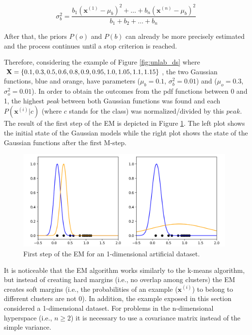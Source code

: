 \begin{equation}
    \sigma^{2}_b = \frac{b_{1}(\mathbf{x}^{(1)} - \mu_{b})^{2} + \ldots + b_{n}(\mathbf{x}^{(n)} - \mu_{b})^{2}}{b_{1} + b_{2} + \ldots + b_{n}}
\end{equation}

After that, the priors $P(o)$ and $P(b)$ can already be more precisely estimated and the process continues until a stop criterion is reached.

Therefore, considering the example of Figure \ref{fig:unlab_ds} where $\mathbf{X} = \{0.1, 0.3, 0.5,\\ 0.6, 0.8, 0.9, 0.95, 1.0, 1.05, 1.1, 1.15 \}$, the two Gaussian functions, blue and orange, have parameters ($\mu_{b} = 0.1$, $\sigma^{2}_{b} = 0.01$) and ($\mu_{o} = 0.3$, $\sigma^{2}_{o} = 0.01$). In order to obtain the outcomes from the pdf functions between 0 and 1, the highest \textit{peak} between both Gaussian functions was found and each $P(\mathbf{x}^{(i)}|c)$ (where $c$ stands for the class) was normalized/divided by this $peak$. The result of the first step of the EM is depicted in Figure \ref{fig:step1}. The left plot shows the initial state of the Gaussian models while the right plot shows the state of the Gaussian functions after the first M-step.

\begin{figure}[ht]
\centering
\includegraphics[width=11cm]{"Part 3 - Learning Systems/Unsupervised Learning/Expectation-Maximization/figures/step1.png"}
\caption{First step of the EM for an 1-dimensional artificial dataset.}
\label{fig:step1}
\end{figure}


It is noticeable that the EM algorithm works similarly to the k-means algorithm, but instead of creating hard margins (i.e., no overlap among clusters) the EM creates soft margins (i.e., the probabilities of an example ($\mathbf{x}^{(i)}$) to belong to different clusters are not 0). In addition, the example exposed in this section considered a 1-dimensional dataset. For problems in the n-dimensional hyperspace (i.e., $n \geq 2$) it is necessary to use a covariance matrix instead of the simple variance. 



